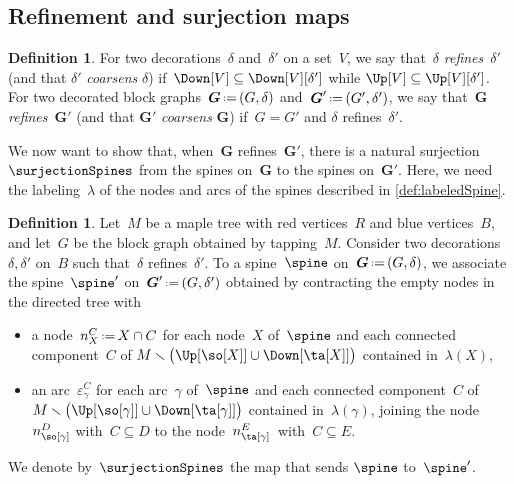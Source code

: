 \documentclass{amsart}
\theoremstyle{definition}
\newtheorem{definition}[theorem]{Definition}
\renewcommand{\b}[1]{{\boldsymbol{#1}}} %
\newcommand{\ssm}{\smallsetminus} %
\newcommand{\eqdef}{\mbox{\,\raisebox{0.2ex}{\scriptsize\ensuremath{\mathrm:}}\ensuremath{=}\,}} %
\newcommand{\darkblue}{\color{darkblue}} %
\newcommand{\defn}[1]{\textsl{\darkblue #1}} %
\newcommand{\vertexSet}{V}
\newcommand{\decoration}{\delta}
\newcommand{\labeling}{\lambda} %
\begin{document}

\subsection{Refinement and surjection maps}
\label{subsec:surjectionMaps}

\begin{definition}
  \label{def:refinement}
  For two decorations~$\decoration$ and~$\decoration'$ on a set~$\vertexSet$, we say that~$\decoration$ \defn{refines}~$\decoration'$ (and that $\decoration'$ \defn{coarsens} $\decoration$) if~$\Down[\vertexSet] \subseteq \Down[\vertexSet][\decoration']$ while $\Up[\vertexSet] \subseteq \Up[\vertexSet][\decoration']$.
  For two decorated block graphs~$\b{G} \eqdef (G, \decoration)$ and~$\b{G}' \eqdef (G', \decoration')$, we say that~$\b{G}$ \defn{refines}~$\b{G}'$ (and that $\b{G}'$ \defn{coarsens} $\b{G}$) if~$G = G'$ and $\decoration$ refines~$\decoration'$.
\end{definition}

We now want to show that, when~$\b{G}$ refines~$\b{G}'$, there is a natural surjection~$\surjectionSpines$ from the spines on~$\b{G}$ to the spines on~$\b{G}'$.
Here, we need the labeling~$\labeling$ of the nodes and arcs of the spines described in \cref{def:labeledSpine}.

\begin{definition}
  \label{def:refinementSpines}
  Let~$M$ be a maple tree with red vertices~$R$ and blue vertices~$B$, and let~$G$ be the block graph obtained by tapping~$M$.
  Consider two decorations~$\decoration, \decoration'$ on~$B$ such that~$\decoration$ refines~$\decoration'$.
  To a spine~$\spine$ on~$\b{G} \eqdef (G, \decoration)$, we associate the spine~$\spine'$ on~$\b{G}' \eqdef (G, \decoration')$ obtained by contracting the empty nodes in the directed tree with
  \begin{itemize}
    \item a node~$n_X^C \eqdef X \cap C$ for each node~$X$ of~$\spine$ and each connected component~$C$ of \linebreak ${M \ssm \big( \Up[{\so[X]}] \cup \Down[{\ta[X]}] \big)}$ contained in~$\labeling(X)$,
    \item an arc~$\varepsilon_\gamma^C$ for each arc~$\gamma$ of~$\spine$ and each connected component~$C$ of~$M \ssm \big( \Up[{\so[\gamma]}] \cup \Down[{\ta[\gamma]}] \big)$ contained in~$\labeling(\gamma)$, joining the node~$n_{\so[\gamma]}^D$ with~$C \subseteq D$ to the node~$n_{\ta[\gamma]}^{E}$~with~${C \subseteq E}$.
  \end{itemize}
  We denote by~$\surjectionSpines$ the map that sends $\spine$ to~$\spine'$.
\end{definition}
\end{document}
